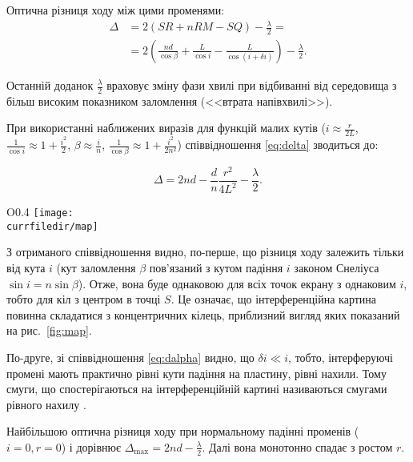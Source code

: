 Оптична різниця ходу між цими променями:
\begin{align}
	\Delta & = 2\left( SR + n RM  - SQ \right) - \frac{\lambda}{2} = \nonumber                                                                          \\
	       & =2\left( \frac{nd}{\cos\beta} + \frac{L}{\cos i} - \frac{L}{\cos\left(  i + \delta i\right) }\right) - \frac{\lambda}{2}. \label{eq:delta}
\end{align}

Останній доданок $\frac{\lambda}{2}$ враховує зміну фази хвилі при відбиванні від середовища з більш високим показником заломлення (<<втрата напівхвилі>>).

При
використанні наближених виразів для функцій малих кутів ($ i \approx  \frac{r}{2L}$, $\frac{1}{\cos i} \approx 1 + \frac{ i^2}{2}$, $\beta\approx\frac{ i}{n}$, $\frac{1}{\cos\beta}\approx 1 + \frac{ i^2}{2n^2}$) співвідношення \eqref{eq:delta} зводиться до:

\begin{equation} \label{eq:delta1}
	\Delta = 2nd - \frac{d}{n} \frac{r^2}{4L^2} - \frac{\lambda}{2}.
\end{equation}

\begin{wrapfigure}{O}{0.4\columnwidth}
	\centering
	\texttt{[image: \\currfiledir/map]}
	\caption{Інтерференційна картина}
	\label{fig:map}
\end{wrapfigure}
З отриманого співвідношення видно, по-перше, що різниця ходу залежить тільки від кута $ i$ (кут заломлення $\beta$ пов'язаний з кутом падіння $ i$ законом Снеліуса $\sin i = n \sin\beta$). Отже, вона буде однаковою для всіх точок екрану з однаковим $ i$, тобто для кіл з центром в точці \hyperref[fig:scheme]{$S$}. Це означає, що інтерференційна картина повинна складатися з концентричних кілець, приблизний вигляд яких показаний на рис.~\ref{fig:map}.


По-друге, зі співвідношення \eqref{eq:dalpha} видно, що $\delta i \ll  i$, тобто, інтерферуючі промені мають практично рівні кути падіння на пластину, рівні нахили. Тому смуги, що спостерігаються на інтерференційній картині називаються смугами рівного нахилу \cite[\S 6, стор. 85]{Godzhaev}.



Найбільшою оптична різниця ходу при нормальному падінні променів ($ i = 0, r = 0$) і дорівнює  $\Delta_{\max} = 2nd - \frac{\lambda}{2}$. Далі вона монотонно спадає з ростом $r$.

